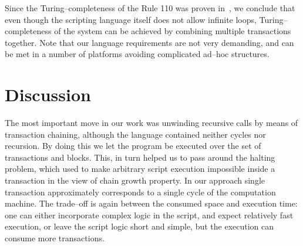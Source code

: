 \documentclass[runningheads]{llncs}
\begin{document}
    Since the Turing--completeness of the Rule 110 was proven
    in~\cite{cook2004universality}, we conclude that even though the scripting
    language itself does not allow infinite loops, Turing--completeness of the
    system can be achieved by combining multiple transactions together. Note
    that our language requirements are not very demanding, and can be met in a
    number of platforms avoiding complicated ad--hoc structures.

    \section{Discussion}
    \label{section3}
    The most important move in our work was unwinding recursive calls by means
    of transaction chaining, although the language contained neither cycles nor
    recursion. By doing this we let the program be executed over the set of
    transactions and blocks. This, in turn helped us to pass around the halting
    problem, which used to make arbitrary script execution impossible inside a
    transaction in the view of chain growth property. In our approach single
    transaction approximately corresponds to a single cycle of the computation
    machine. The trade--off is again between the consumed space and execution
    time: one can either incorporate complex logic in the script, and expect
    relatively fast execution, or leave the script logic short and simple, but
    the execution can consume more transactions.
\end{document}
